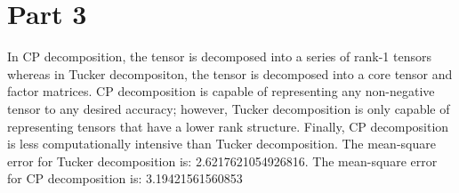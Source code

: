 \documentclass{article}%
\begin{document}
%
\section{Part 3}%
\label{sec:Part3}%
In CP decomposition, the tensor is decomposed into a series of rank{-}1 tensors whereas in Tucker decompositon,\newline%
        the tensor is decomposed into a core tensor and factor matrices. CP decomposition is capable of representing any non{-}negative tensor\newline%
        to any desired accuracy; however, Tucker decomposition is only capable of representing tensors that have a lower rank structure.\newline%
        Finally, CP decomposition is less computationally intensive than Tucker decomposition.%
The mean{-}square error for Tucker decomposition is: 2.6217621054926816.\newline%
\newline%
%
The mean{-}square error for CP decomposition is: 3.19421561560853\newline%
\newline%

%
\end{document}
